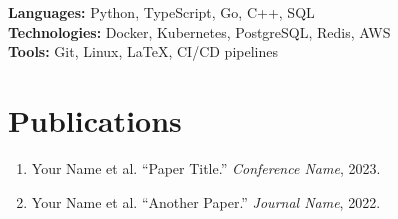 \documentclass[11pt]{article}
\begin{document}
\textbf{Languages:} Python, TypeScript, Go, C++, SQL \\
\textbf{Technologies:} Docker, Kubernetes, PostgreSQL, Redis, AWS \\
\textbf{Tools:} Git, Linux, \LaTeX, CI/CD pipelines

\section*{Publications}

\begin{enumerate}
  \item Your Name et al. ``Paper Title.'' \textit{Conference Name}, 2023.
  \item Your Name et al. ``Another Paper.'' \textit{Journal Name}, 2022.
\end{enumerate}
\end{document}
